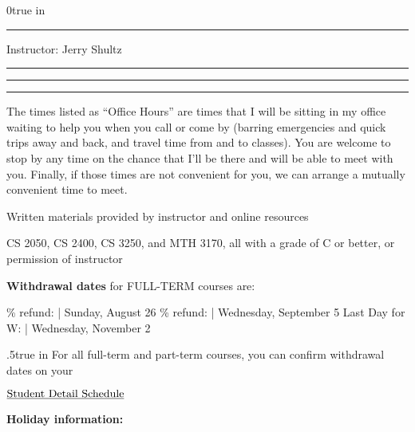 




\parindent 0true in


\medskip
\hrule
\bigskip
Instructor: Jerry Shultz
\medskip
\hrule
\medskip
{}
\medskip
{}
\medskip
\hrule
\medskip


\medskip
\hrule
\medskip

The times listed as ``Office Hours'' are times that I will be sitting in my office waiting to help you when you call or come by (barring emergencies and
quick trips away and back, and travel time from and to classes).
\medskip
 You are
welcome to stop by any time on the chance that I'll be there and will be able to meet with you.
Finally, if those times are not convenient for you, we can arrange a mutually convenient time
to meet.
\bigskip

\vfil\eject


Written materials provided by instructor and online resources

\medskip

CS 2050, CS 2400, CS 3250, and MTH 3170, all with a grade of C or better, or permission of instructor
\medskip




{\bf Withdrawal dates} for FULL-TERM courses are:
\medskip

\% refund: |  Sunday, August 26 \% refund:  | Wednesday, September 5 \nr
Last Day for W:   | Wednesday, November 2
\endruledtable
\medskip

{\advance \leftskip .5true in
For all full-term and part-term courses, you can confirm withdrawal dates on your

$\underline{\hbox{Student Detail Schedule}}$
\medskip
}

{\bf Holiday information:}

